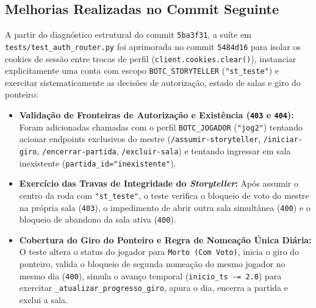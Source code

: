 \documentclass[12pt,a4paper]{article}
\begin{document}
\subsection{Melhorias Realizadas no Commit Seguinte}
A partir do diagnóstico estrutural do commit \texttt{5ba3f31}, a suíte em \texttt{tests/test\_auth\_router.py} foi aprimorada no commit \texttt{5484d16} para isolar os cookies de sessão entre trocas de perfil (\texttt{client.cookies.clear()}), instanciar explicitamente uma conta com escopo \texttt{BOTC\_STORYTELLER} (\texttt{"st\_teste"}) e exercitar sistematicamente as decisões de autorização, estado de salas e giro do ponteiro:

\begin{itemize}[leftmargin=1.5em]
    \item \textbf{Validação de Fronteiras de Autorização e Existência (\texttt{403} e \texttt{404}):} Foram adicionadas chamadas com o perfil \texttt{BOTC\_JOGADOR} (\texttt{"jog2"}) tentando acionar endpoints exclusivos do mestre (\texttt{/assumir-storyteller}, \texttt{/iniciar-giro}, \texttt{/encerrar-partida}, \texttt{/excluir-sala}) e tentando ingressar em sala inexistente (\texttt{partida\_id="inexistente"}).
    \item \textbf{Exercício das Travas de Integridade do \textit{Storyteller}:} Após assumir o centro da roda com \texttt{"st\_teste"}, o teste verifica o bloqueio de voto do mestre na própria sala (\texttt{403}), o impedimento de abrir outra sala simultânea (\texttt{400}) e o bloqueio de abandono da sala ativa (\texttt{400}).
    \item \textbf{Cobertura do Giro do Ponteiro e Regra de Nomeação Única Diária:} O teste altera o status do jogador para \texttt{Morto (Com Voto)}, inicia o giro do ponteiro, valida o bloqueio de segunda nomeação do mesmo jogador no mesmo dia (\texttt{400}), simula o avanço temporal (\texttt{inicio\_ts -= 2.0}) para exercitar \texttt{\_atualizar\_progresso\_giro}, apura o dia, encerra a partida e exclui a sala.
\end{itemize}
\end{document}
